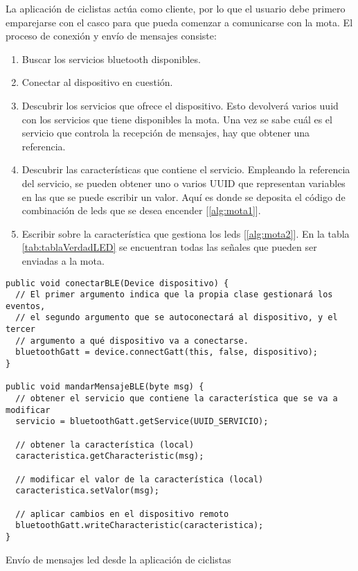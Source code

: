 La aplicación de ciclistas actúa como cliente, por lo que el usuario debe primero emparejarse con el casco para que pueda comenzar a comunicarse con la mota. El proceso de conexión y envío de mensajes consiste:
\begin{enumerate}
	\item Buscar los servicios bluetooth disponibles.

	\item Conectar al dispositivo en cuestión.

	\item Descubrir los servicios que ofrece el dispositivo. Esto devolverá varios \gls{uuid} con los servicios que tiene disponibles la mota. Una vez se sabe cuál es el servicio que controla la recepción de mensajes, hay que obtener	una referencia.

	\item Descubrir las características que contiene el servicio. Empleando la referencia del servicio, se pueden obtener uno o varios UUID que representan variables en las que se puede escribir un valor. Aquí es donde se deposita	el código de combinación de leds que se desea encender [\ref{alg:mota1}].

	\item Escribir sobre la característica que gestiona los leds [\ref{alg:mota2}]. En la tabla	\ref{tab:tablaVerdadLED} se encuentran todas las señales que pueden ser enviadas a la mota.
		\end{enumerate}

\begin{listing}
\begin{minipage}{.4\textwidth}
\begin{verbatim}
public void conectarBLE(Device dispositivo) {
  // El primer argumento indica que la propia clase gestionará los eventos,
  // el segundo argumento que se autoconectará al dispositivo, y el tercer
  // argumento a qué dispositivo va a conectarse.
  bluetoothGatt = device.connectGatt(this, false, dispositivo);
}

public void mandarMensajeBLE(byte msg) {
  // obtener el servicio que contiene la característica que se va a modificar
  servicio = bluetoothGatt.getService(UUID_SERVICIO);

  // obtener la característica (local)
  caracteristica.getCharacteristic(msg);

  // modificar el valor de la característica (local)
  caracteristica.setValor(msg);

  // aplicar cambios en el dispositivo remoto
  bluetoothGatt.writeCharacteristic(caracteristica);
}
\end{verbatim}
\end{minipage}
\caption{Envío de mensajes led desde la aplicación de ciclistas}\label{alg:appciclistasBLE}
\end{listing}

